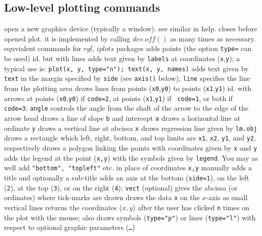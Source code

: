 \subsection{Low-level plotting commands}{}
	{open a new graphics device (typically a window). see similar in help.}
	{closes before opened plot. it is implemented by
calling $dev.off()$ as many times as necessary.}
	{equvialent commands for $rgl$, $iplots$ packages}
	{adds points (the option {\tt type=} can be used)}
	{ id. but with lines}
	{ adds text given by {\tt labels} at
coordinates ({\tt x},{\tt y}); a typical use is: {\tt plot(x, y, type="n");
text(x, y, names)}}
	{adds text given by {\tt text} in
the margin specified by {\tt side} (see {\tt axis()} below); {\tt line}
specifies the line from the plotting area}
	{ draws lines from points ({\tt x0},{\tt y0})
to points ({\tt x1},{\tt y1})}
	{id. with arrows at points
({\tt x0},{\tt y0}) if {\tt code=2}, at points ({\tt x1},{\tt y1}) if {\tt
code=1}, or both if {\tt code=3}; {\tt angle} controls the angle from the shaft
of the arrow to the edge of the arrow head}
	{draws a line of slope {\tt b} and intercept {\tt a}}
	{ draws a horizontal line at ordinate {\tt y}}
	{ draws a vertical line at abcissa {\tt x}}
	{ draws regression line given by {\tt lm.obj}}
	{ draws a rectangle which left, right, bottom, and
top limits are {\tt x1}, {\tt x2}, {\tt y1}, and {\tt y2}, respectively}
	{draws a polygon linking the points with coordinates
given by {\tt x} and {\tt y}}
	{ adds the legend at the point ({\tt x,y})
with the symbols given by {\tt legend}. You may as well add {\tt "bottom",
"topleft"} etc. in place of coordinates {\tt x,y} manually}
	{ adds a title and optionally a sub-title}
	{adds an axis at the bottom ({\tt side=1}), on the left
({\tt 2}), at the top ({\tt 3}), or on the right ({\tt 4}); {\tt vect}
(optional) gives the abcissa (or ordinates) where tick-marks are drawn}
	{draws the data {\tt x} on the $x$-axis as small vertical lines}
	{returns the coordinates ($x,y$) after the
user has clicked {\tt n} times on the plot with the mouse; also draws
symbols ({\tt type="p"}) or lines ({\tt type="l"}) with respect to optional
graphic parameters ({\tt \ldots})}

